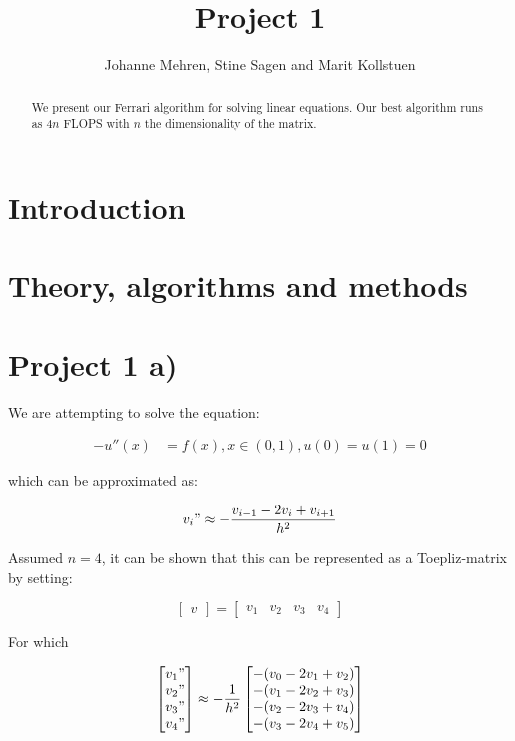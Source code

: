 \documentclass{article}
\title{Project 1}
\author{Johanne Mehren, Stine Sagen and Marit Kollstuen}
\begin{document}
\begin{abstract}
We present our Ferrari algorithm for solving linear equations. Our best algorithm runs as $4n$ FLOPS with $n$ the dimensionality of the matrix.
\end{abstract}


\maketitle

\section{Introduction}

\section{Theory, algorithms and methods}

\section{Project 1 a)}

We are attempting to solve the equation: 

\begin{align*}
	-u''(x) & = f(x), x \in (0, 1), u(0) = u(1) = 0
\end{align*}

which can be approximated as:

\begin{equation}
	v_i" \approx -\frac{v_{i-1}- 2v_i + v_{i+1}}{h^2}
\end{equation}

Assumed $n= 4$, it can be shown that this can be represented as a Toepliz-matrix by setting: 

\[
\begin{bmatrix}
	v
\end{bmatrix}
=
\begin{bmatrix}
	 v_1 & v_2 & v_3 & v_4
\end{bmatrix}
\]

For which 

\[
\begin{bmatrix}
	v_1" \\  v_2" \\ v_3" \\ v_4"
\end{bmatrix}
	\approx -\frac{1}{h^2}
\begin{bmatrix}
	-(v_{0} -2v_1 +v_2) \\
	-(v_1 -2v_2 +v_3) \\
	-(v_{2} -2v_3 +v_4) \\
	-(v_{3} -2v_4 +v_5) 
\end{bmatrix}
\]
\end{document}

